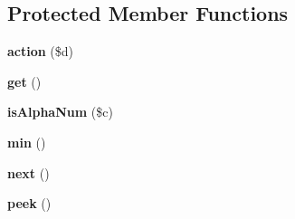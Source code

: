 \subsection*{Protected Member Functions}
\begin{DoxyCompactItemize}
\item 
\hypertarget{class_j_s_min_a98be5ec33c7853a1029503ccdb4b078c}{
{\bfseries action} (\$d)}
\label{class_j_s_min_a98be5ec33c7853a1029503ccdb4b078c}

\item 
\hypertarget{class_j_s_min_ac33ee765f5ad9f134540bac393721cfe}{
{\bfseries get} ()}
\label{class_j_s_min_ac33ee765f5ad9f134540bac393721cfe}

\item 
\hypertarget{class_j_s_min_a2bb6bd010621e6d692c84ad72952f81e}{
{\bfseries isAlphaNum} (\$c)}
\label{class_j_s_min_a2bb6bd010621e6d692c84ad72952f81e}

\item 
\hypertarget{class_j_s_min_a0bb962b33915e2c1a507e95798a453a6}{
{\bfseries min} ()}
\label{class_j_s_min_a0bb962b33915e2c1a507e95798a453a6}

\item 
\hypertarget{class_j_s_min_acea62048bfee7b3cd80ed446c86fb78a}{
{\bfseries next} ()}
\label{class_j_s_min_acea62048bfee7b3cd80ed446c86fb78a}

\item 
\hypertarget{class_j_s_min_af0d2b98b49496eaef856a5b277fa775b}{
{\bfseries peek} ()}
\label{class_j_s_min_af0d2b98b49496eaef856a5b277fa775b}

\end{DoxyCompactItemize}
